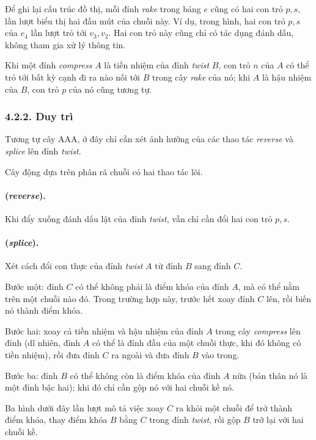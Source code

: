 \documentclass[11pt]{article}
\begin{document}
Để ghi lại cấu trúc đồ thị, mỗi đỉnh \emph{rake} trong bảng \(e\) cũng có
hai con trỏ \(p,s\), lần lượt biểu thị hai đầu mút của chuỗi này. Ví dụ,
trong hình, hai con trỏ \(p,s\) của \(e_4\) lần lượt trỏ tới \(v_3,v_2\). Hai
con trỏ này cũng chỉ có tác dụng đánh dấu, không tham gia xử lý thông tin.

Khi một đỉnh \emph{compress} \(A\) là tiền nhiệm của đỉnh \emph{twist} \(B\),
con trỏ \(n\) của \(A\) có thể trỏ tới bất kỳ cạnh đi ra nào nối tới \(B\)
trong cây \emph{rake} của nó; khi \(A\) là hậu nhiệm của \(B\), con trỏ \(p\)
của nó cũng tương tự.

\subsubsection*{4.2.2. Duy trì}

Tương tự cây AAA, ở đây chỉ cần xét ảnh hưởng của các thao tác
\emph{reverse} và \emph{splice} lên đỉnh \emph{twist}.

Cây động dựa trên phân rã chuỗi có hai thao tác lõi.

\paragraph{ (\emph{reverse}).}
Khi đẩy xuống đánh dấu lật của đỉnh \emph{twist}, vẫn chỉ cần đổi hai con
trỏ \(p,s\).

\paragraph{ (\emph{splice}).}
Xét cách đổi con thực của đỉnh \emph{twist} \(A\) từ đỉnh \(B\) sang đỉnh
\(C\).

Bước một: đỉnh \(C\) có thể không phải là điểm khóa của đỉnh \(A\), mà có thể
nằm trên một chuỗi nào đó. Trong trường hợp này, trước hết xoay đỉnh \(C\)
lên, rồi biến nó thành điểm khóa.

Bước hai: xoay cả tiền nhiệm và hậu nhiệm của đỉnh \(A\) trong cây
\emph{compress} lên đỉnh (dĩ nhiên, đỉnh \(A\) có thể là đỉnh đầu của một
chuỗi thực, khi đó không có tiền nhiệm), rồi đưa đỉnh \(C\) ra ngoài và đưa
đỉnh \(B\) vào trong.

Bước ba: đỉnh \(B\) có thể không còn là điểm khóa của đỉnh \(A\) nữa (bản
thân nó là một đỉnh bậc hai); khi đó chỉ cần gộp nó với hai chuỗi kề nó.

Ba hình dưới đây lần lượt mô tả việc xoay \(C\) ra khỏi một chuỗi để trở thành
điểm khóa, thay điểm khóa \(B\) bằng \(C\) trong đỉnh \emph{twist}, rồi gộp
\(B\) trở lại với hai chuỗi kề.
\end{document}

